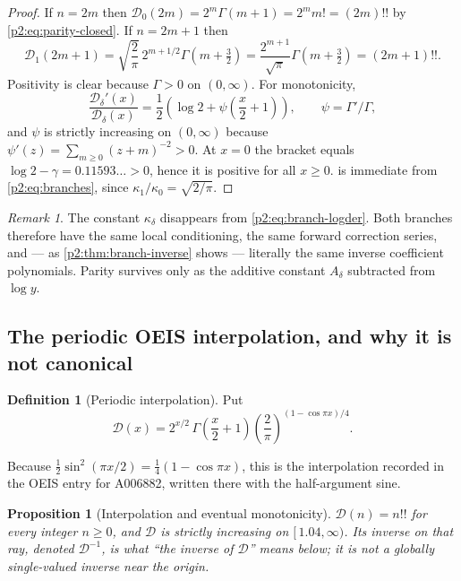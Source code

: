 \documentclass[11pt,a4paper,oneside]{book}
\theoremstyle{plain}
\newtheorem{proposition}[theorem]{Proposition}
\theoremstyle{definition}
\newtheorem{definition}[theorem]{Definition}
\theoremstyle{remark}
\newtheorem{remark}[theorem]{Remark}
\begin{document}
\begin{proof}
If \(n=2m\) then \(\mathcal D_0(2m)=2^m\Gamma(m+1)=2^mm!=(2m)!!\) by
\cref{p2:eq:parity-closed}.  If \(n=2m+1\) then
\[
 \mathcal D_1(2m+1)=\sqrt{\frac2\pi}\,2^{m+1/2}
 \Gamma\!\left(m+\tfrac32\right)
 =\frac{2^{m+1}}{\sqrt\pi}\Gamma\!\left(m+\tfrac32\right)=(2m+1)!!.
\]
Positivity is clear because \(\Gamma>0\) on \((0,\infty)\).  For monotonicity,
\begin{equation}
 \frac{\mathcal D_\delta'(x)}{\mathcal D_\delta(x)}
 =\frac12\left(\log2+\psi\!\left(\frac x2+1\right)\right),
 \qquad \psi=\Gamma'/\Gamma,
 \label{p2:eq:branch-logder}
\end{equation}
and \(\psi\) is strictly increasing on \((0,\infty)\) because
\(\psi'(z)=\sum_{m\ge0}(z+m)^{-2}>0\).  At \(x=0\) the bracket equals
\(\log2-\gamma=0.11593\ldots>0\), hence it is positive for all \(x\ge0\).
 is immediate from \cref{p2:eq:branches}, since
\(\kappa_1/\kappa_0=\sqrt{2/\pi}\).
\end{proof}

\begin{remark}
\label{p2:rem:kappa-cancels}
The constant \(\kappa_\delta\) disappears from
\cref{p2:eq:branch-logder}.  Both branches therefore have the same local
conditioning, the same forward correction series, and --- as
\cref{p2:thm:branch-inverse} shows --- literally the same inverse coefficient
polynomials.  Parity survives only as the additive constant \(A_\delta\)
subtracted from \(\log y\).
\end{remark}

\subsection{The periodic OEIS interpolation, and why it is not canonical}

\begin{definition}[Periodic interpolation]
\label{p2:def:oeis}
Put
\begin{equation}
 \mathscr D(x)=2^{x/2}\,\Gamma\!\left(\frac x2+1\right)
 \left(\frac2\pi\right)^{(1-\cos\pi x)/4}.
 \label{p2:eq:oeis}
\end{equation}
\end{definition}

Because \(\tfrac12\sin^2(\pi x/2)=\tfrac14(1-\cos\pi x)\), this is the
interpolation recorded in the OEIS entry for A006882, written there with the
half-argument sine.

\begin{proposition}[Interpolation and eventual monotonicity]
\label{p2:prop:oeis-interp}
\(\mathscr D(n)=n!!\) for every integer \(n\ge0\), and \(\mathscr D\) is
strictly increasing on \([\,1.04,\infty)\).  Its inverse on that ray,
denoted \(\mathscr D^{-1}\), is what ``the inverse of \(\mathscr D\)'' means
below; it is not a globally single-valued inverse near the origin.
\end{proposition}
\end{document}

